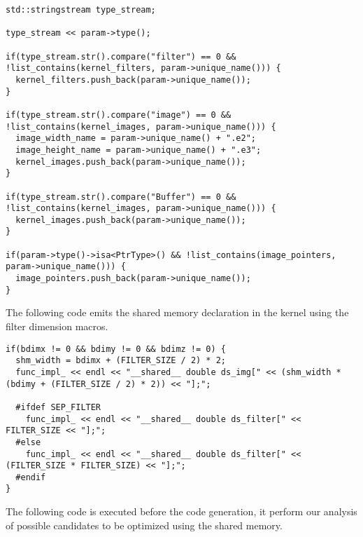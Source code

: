 \documentclass{article}
\begin{document}
\begin{verbatim}
std::stringstream type_stream;

type_stream << param->type();

if(type_stream.str().compare("filter") == 0 && !list_contains(kernel_filters, param->unique_name())) {
  kernel_filters.push_back(param->unique_name());
}

if(type_stream.str().compare("image") == 0 && !list_contains(kernel_images, param->unique_name())) {
  image_width_name = param->unique_name() + ".e2";
  image_height_name = param->unique_name() + ".e3";
  kernel_images.push_back(param->unique_name());
}

if(type_stream.str().compare("Buffer") == 0 && !list_contains(kernel_images, param->unique_name())) {
  kernel_images.push_back(param->unique_name());
}

if(param->type()->isa<PtrType>() && !list_contains(image_pointers, param->unique_name())) {
  image_pointers.push_back(param->unique_name());
}
\end{verbatim}

The following code emits the shared memory declaration in the kernel using the filter dimension macros.

\begin{verbatim}
if(bdimx != 0 && bdimy != 0 && bdimz != 0) {
  shm_width = bdimx + (FILTER_SIZE / 2) * 2;
  func_impl_ << endl << "__shared__ double ds_img[" << (shm_width * (bdimy + (FILTER_SIZE / 2) * 2)) << "];";

  #ifdef SEP_FILTER
    func_impl_ << endl << "__shared__ double ds_filter[" << FILTER_SIZE << "];";
  #else
    func_impl_ << endl << "__shared__ double ds_filter[" << (FILTER_SIZE * FILTER_SIZE) << "];";
  #endif
}
\end{verbatim}

The following code is executed before the code generation, it perform our analysis of possible candidates to be optimized using the shared memory.
\end{document}

